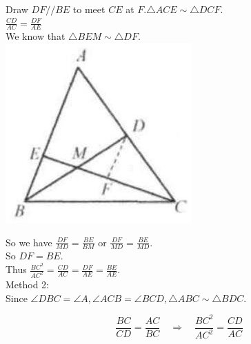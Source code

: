 \documentclass{article}
\begin{document}
Draw \(D F / / B E\) to meet \(C E\) at \(F . \triangle A C E \sim \triangle D C F\).\\
\(\frac{C D}{A C}=\frac{D F}{A E}\)\\
We know that \(\triangle B E M \sim \triangle D F\).\\
\centering
\includegraphics[width=\textwidth]{images/115(1).jpg}

So we have \(\frac{D F}{M D}=\frac{B E}{B M}\) or \(\frac{D F}{M D}=\frac{B E}{M D}\).\\
So \(D F=B E\).\\
Thus \(\frac{B C^{2}}{A C^{2}}=\frac{C D}{A C}=\frac{D F}{A E}=\frac{B E}{A E}\).\\
Method 2:\\
Since \(\angle D B C=\angle A, \angle A C B=\angle B C D, \triangle A B C \sim \triangle B D C\).

\[
\frac{B C}{C D}=\frac{A C}{B C} \quad \Rightarrow \quad \frac{B C^{2}}{A C^{2}}=\frac{C D}{A C}
\]
\end{document}
